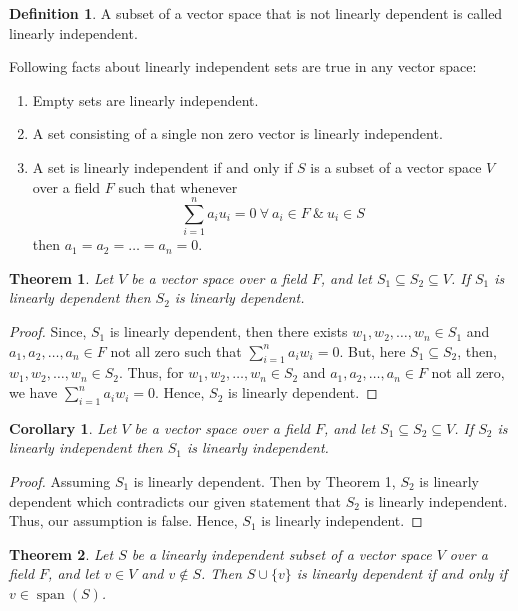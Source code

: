 \documentclass[12pt, a4paper]{article}
\newtheorem{theorem}{Theorem}[section]
\newtheorem{corollary}{Corollary}[theorem]
\theoremstyle{definition}
\newtheorem{definition}{Definition}[section]
\theoremstyle{remark}
\DeclareMathOperator{\Span}{span}
\begin{document}
\begin{definition}
    A subset of a vector space that is not linearly dependent is called linearly independent.
\end{definition}

Following facts about linearly independent sets are true in any vector space:
\begin{enumerate}
    \item Empty sets are linearly independent.
    \item A set consisting of a single non zero vector is linearly independent.
    \item A set is linearly independent if and only if $S$ is a subset of a vector space $V$ over a field $F$ such that whenever
    \[
    \sum_{i = 1}^{n} a_iu_i = 0 \ \forall \ a_i \in F \ \& \ u_i \in S
    \]
    then $a_1=a_2=\ldots=a_n=0$.
\end{enumerate}

\begin{theorem}
    Let $V$ be a vector space over a field $F$, and let $S_1 \subseteq S_2 \subseteq V$. If $S_1$ is linearly dependent then $S_2$ is linearly dependent.
\end{theorem}

\begin{proof}
    Since, $S_1$ is linearly dependent, then there exists $w_1, w_2, \dots, w_n \in S_1$ and $a_1, a_2, \dots, a_n \in F$ not all zero such that $\displaystyle\sum_{i=1}^{n} a_i w_i = 0$. But, here $S_1 \subseteq S_2$, then, $w_1, w_2, \dots, w_n \in S_2$. Thus, for $w_1, w_2, \dots, w_n \in S_2$ and $a_1, a_2, \dots, a_n \in F$ not all zero, we have $\displaystyle\sum_{i=1}^{n} a_i w_i = 0$. Hence, $S_2$ is linearly dependent.
\end{proof}

\begin{corollary}
    Let $V$ be a vector space over a field $F$, and let $S_1 \subseteq S_2 \subseteq V$. If $S_2$ is linearly independent then $S_1$ is linearly independent.
\end{corollary}

\begin{proof}
    Assuming $S_1$ is linearly dependent. Then by Theorem 1, $S_2$ is linearly dependent which contradicts our given statement that $S_2$ is linearly independent. Thus, our assumption is false. Hence, $S_1$ is linearly independent.
\end{proof}

\begin{theorem}
    Let $S$ be a linearly independent subset of a vector space $V$ over a field $F$, and let $v \in V$ and $v \notin S$. Then $S \cup \{v\}$ is linearly dependent if and only if $v \in \Span(S)$.
\end{theorem}
\end{document}
